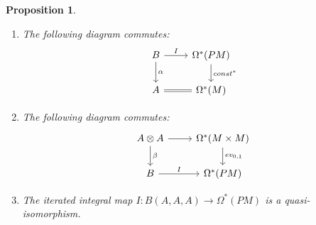 \documentclass{scrartcl}
\theoremstyle{plain}
\newtheorem{proposition}[theorem]{Proposition}
\theoremstyle{definition}
\begin{document}
\begin{proposition}\label{thm:path-models-0}
    \begin{enumerate}
    \item The following diagram commutes: 
    \begin{equation}\label{diag:path-models-0-1}
    \begin{tikzcd}
        B \rar["I"] \dar["\alpha"] & \Omega^*(PM) \dar["const^*"] \\
        A \rar[equal] & \Omega^*(M)
    \end{tikzcd}
    \end{equation}
    \item The following diagram commutes:
    \begin{equation}\label{diag:path-models-0-2}
        \begin{tikzcd}
        A \otimes A \rar \dar["\beta"] & \Omega^*(M\times M)\dar["ev_{0,1}"] \\
        B \rar["I"] & \Omega^*(PM)
        \end{tikzcd}
    \end{equation}
    \item The iterated integral map $I\colon B(A, A, A)\to \Omega^*(PM)$ is a quasi-isomorphism. 
\end{enumerate}
\end{proposition}
\end{document}
